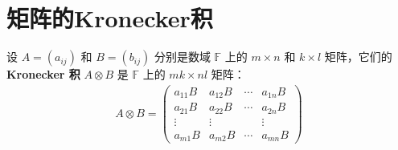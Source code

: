 \documentclass[../../main.tex]{subfiles}
\begin{document}
\section{矩阵的Kronecker积}

\begin{definition}[矩阵的Kronecker积]
设 $A=(a_{ij})$ 和 $B=(b_{ij})$ 分别是数域 $\mathbb{F}$ 上的 $m\times n$ 和 $k\times l$ 矩阵，它们的 \textbf{Kronecker 积} $A\otimes B$ 是 $\mathbb{F}$ 上的 $mk\times nl$ 矩阵：
\begin{align*}
A\otimes B = 
\begin{pmatrix}
a_{11}B & a_{12}B & \cdots & a_{1n}B \\
a_{21}B & a_{22}B & \cdots & a_{2n}B \\
\vdots & \vdots & & \vdots \\
a_{m1}B & a_{m2}B & \cdots & a_{mn}B
\end{pmatrix}
\end{align*}
\end{definition}
\end{document}
